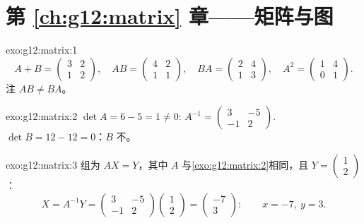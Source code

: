 \section*{第 \ref{ch:g12:matrix} 章——矩阵与图}

\begin{solution}{exo:g12:matrix:1}
\[
A + B = \begin{pmatrix} 3 & 2\\ 1 & 2\end{pmatrix}, \quad
AB = \begin{pmatrix} 4 & 2\\ 1 & 1\end{pmatrix}, \quad
BA = \begin{pmatrix} 2 & 4\\ 1 & 3\end{pmatrix}, \quad
A^2 = \begin{pmatrix} 1 & 4\\ 0 & 1\end{pmatrix}.
\]
注 $AB \neq BA$。
\end{solution}

\begin{solution}{exo:g12:matrix:2}
$\det A = 6 - 5 = 1 \neq 0$:
$A^{-1} = \begin{pmatrix} 3 & -5\\ -1 & 2 \end{pmatrix}$.
$\det B = 12 - 12 = 0$：$B$ 不。
\end{solution}

\begin{solution}{exo:g12:matrix:3}
组为 $AX = Y$，其中 $A$ 与\cref{exo:g12:matrix:2}相同，且
$Y = \begin{pmatrix} 1\\ 2\end{pmatrix}$：
\[
X = A^{-1}Y = \begin{pmatrix} 3 & -5\\ -1 & 2\end{pmatrix}
\begin{pmatrix} 1\\ 2\end{pmatrix}
= \begin{pmatrix} -7\\ 3\end{pmatrix}:
\qquad x = -7,\ y = 3 .
\]
\end{solution}

